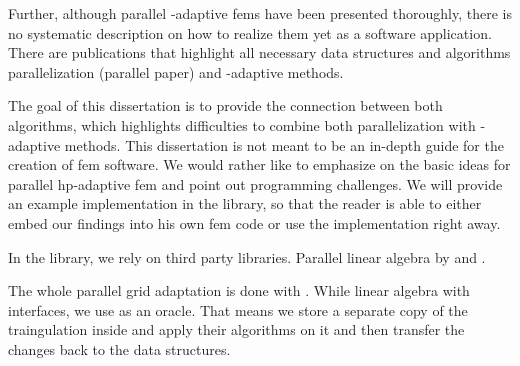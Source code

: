 Further, although parallel \hp-adaptive \glspl{fem} have been presented thoroughly, there is no systematic description on how to realize them yet as a software application. There are publications that highlight all necessary data structures and algorithms parallelization (parallel paper) and \hp-adaptive methods. %

The goal of this dissertation is to provide the connection between both algorithms, which highlights difficulties to combine both parallelization with \hp-adaptive methods. This dissertation is not meant to be an in-depth guide for the creation of \gls{fem} software. We would rather like to emphasize on the basic ideas for parallel hp-adaptive \gls{fem} and point out programming challenges. We will provide an example implementation in the \dealii{} library, so that the reader is able to either embed our findings into his own \gls{fem} code or use the \dealii{} implementation right away.

In the \dealii{} library, we rely on third party libraries. Parallel linear algebra by \trilinos{} and \petsc{}.

The whole parallel grid adaptation is done with \pforest{}. While linear algebra with interfaces, we use \pforest{} as an oracle. That means we store a separate copy of the traingulation inside \pforest{} and apply their algorithms on it and then transfer the changes back to the \dealii{} data structures.

